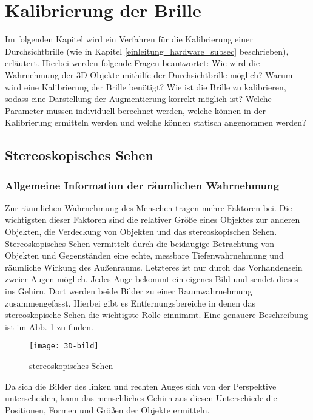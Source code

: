 \section{Kalibrierung der Brille}
Im folgenden Kapitel wird ein Verfahren für die Kalibrierung einer Durchsichtbrille (wie in Kapitel \ref{einleitung_hardware_subsec}  beschrieben), erläutert.
Hierbei werden folgende Fragen beantwortet: 
Wie wird die Wahrnehmung der 3D-Objekte mithilfe der Durchsichtbrille möglich?
Warum wird eine Kalibrierung der Brille benötigt? 
Wie ist die Brille zu kalibrieren, sodass eine Darstellung der Augmentierung korrekt möglich ist? 
Welche Parameter müssen individuell berechnet werden, welche können in der Kalibrierung ermitteln werden und welche können statisch angenommen werden? 

\subsection{Stereoskopisches Sehen}
\label{sec:Stereoskopisches 3D}
\subsubsection{Allgemeine Information der räumlichen Wahrnehmung}
Zur räumlichen Wahrnehmung des Menschen tragen mehre Faktoren bei.
Die wichtigsten dieser Faktoren sind die relativer Größe eines Objektes zur anderen Objekten, die Verdeckung von Objekten und das stereoskopischen Sehen. 
Stereoskopisches Sehen vermittelt durch die beidäugige Betrachtung von Objekten und Gegenständen eine echte, messbare Tiefenwahrnehmung und räumliche Wirkung des Außenraums. 
Letzteres ist nur durch das Vorhandensein zweier Augen möglich.
Jedes Auge bekommt ein eigenes Bild und sendet dieses ins Gehirn.
Dort werden beide Bilder zu einer Raumwahrnehmung zusammengefasst.
Hierbei gibt es Entfernungsbereiche in denen das stereoskopische Sehen die wichtigste Rolle einnimmt.
Eine genauere Beschreibung ist im Abb. \ref{fig:3D} zu finden.

\begin{figure}[h]
   \centering
   \texttt{[image: 3D-bild]}
   \caption{stereoskopisches Sehen}
   \label{fig:3D}
\end{figure}

Da sich die Bilder des linken und rechten Auges sich von der Perspektive unterscheiden, kann das menschliches Gehirn aus diesen Unterschiede die Positionen, Formen und Größen der Objekte ermitteln.

